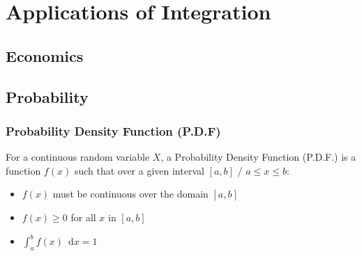 \documentclass[12pt letter]{report}
\begin{document}
\chapter{Applications of Integration}

\section{Economics}

\section{Probability}

\subsection{Probability Density Function (P.D.F)}

For a continuous random variable $X$, a Probability Density Function (P.D.F.) is a function $f(x)$ such that over a
given interval $[a,b]$ / $a \leq x \leq b$:

\begin{itemize}
	\item $f(x)$ must be continuous over the domain $[a,b]$
	\item $f(x) \geq 0$ for all $x$ in $[a,b]$
	\item $\int_{a}^{b} f(x) \enspace  \mathrm{d}x = 1$

\end{itemize}

\end{document}
